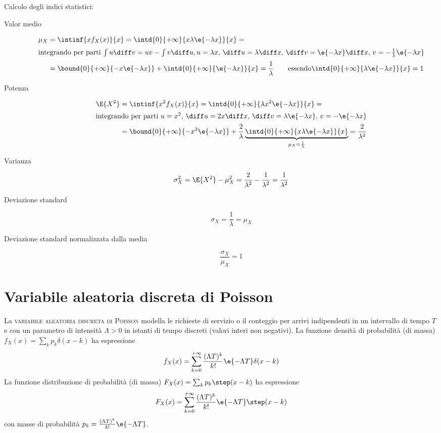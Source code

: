 \begin{flushleft}
Calcolo degli indici statistici:
\end{flushleft}
\begin{description}
\item[Valor medio]
\begin{equation}
\begin{split}
	\mu_X&=\intinf{x f_X(x)}{x}=\intd{0}{+\infty}{x \lambda\e{-\lambda x}}{x}=\\
\intertext{integrando per parti $\int{u \diff v}=u v-\int{v\diff u}, u=\lambda x$, $\diff u=\lambda\diff x$, $\diff v=\e{-\lambda x}\diff x$, $v=-\frac{1}{\lambda}\e{-\lambda x}$}
	&=\bound{0}{+\infty}{-x\e{-\lambda x}}+\intd{0}{+\infty}{\e{-\lambda x}}{x}=\frac{1}{\lambda} 	\qquad\text{essendo} \intd{0}{+\infty}{\lambda\e{-\lambda x}}{x}=1
\end{split}
\end{equation}
\item[Potenza]
\begin{equation}
\begin{split}
	\E{X^2}&=\intinf{x^2 f_X(x)}{x}=\intd{0}{+\infty}{\lambda x^2\e{-\lambda x}}{x}=\\
\intertext{integrando per parti $u=x^2$, $\diff u=2x\diff x$, $\diff v=\lambda\e{-\lambda x}$, $v=-\e{-\lambda x}$}
	&=\bound{0}{+\infty}{-x^2\e{-\lambda x}}+\frac{2}{\lambda}\underbrace{\intd{0}{+\infty}{x \lambda\e{-\lambda x}}{x}}_{{\mu_X}={\frac{1}{\lambda}}}=\frac{2}{\lambda^2}
\end{split}
\end{equation}
\item[Varianza]
\[
	\sigma^2_X=\E{X^2}-\mu^2_X=\frac{2}{\lambda^2}-\frac{1}{\lambda^2}=\frac{1}{\lambda^2}
\]
\item[Deviazione standard]
\[
	\sigma_X=\frac{1}{\lambda}=\mu_X
\]
\item[Deviazione standard normalizzata dalla media] \[
	\frac{\sigma_X}{\mu_X}=1
\]
\end{description}

\section{Variabile aleatoria discreta di Poisson}
La \textsc{variabile aleatoria discreta di Poisson} modella le richieste di servizio o il conteggio per arrivi indipendenti in un intervallo di tempo $T$ e con un parametro di intensità $\Lambda>0$ in istanti di tempo discreti (valori interi non negativi). La funzione densità di probabilità (di massa) $f_X(x)=\sum_k p_k \delta(x-k)$ ha espressione
\begin{equation}
	f_X(x)=\sum_{k=0}^{+\infty}{\frac{(\Lambda T)^k}{k!}\e{-\Lambda T}\delta(x-k)}
\end{equation}
La funzione distribuzione di probabilità (di massa) $F_X(x)=\sum_k p_k \step(x-k)$ ha espressione
\begin{equation}
	F_X(x)=\sum_{k=0}^{+\infty}{\frac{(\Lambda T)^k}{k!}\e{-\Lambda T}\step(x-k)}
\end{equation}
con masse di probabilità $p_k=\frac{(\Lambda T)^k}{k!}\e{-\Lambda T}$.

